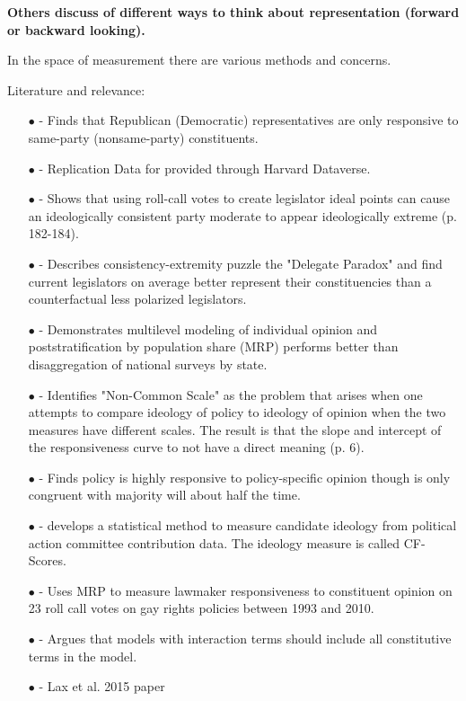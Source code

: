 \documentclass[10pt,letterpaper]{article}
\begin{document}
 \textbf{Others discuss of different ways to think about representation (forward or backward looking).} 
 
In the space of measurement there are various methods and concerns. 

Literature and relevance:
\begin{enumerate}
\item[$\bullet$] \cite{Clinton2006} - Finds that Republican (Democratic) representatives are only responsive to same-party (nonsame-party) constituents.
\item[$\bullet$] \cite{Clinton2009} - Replication Data for \cite{Clinton2006} provided through Harvard Dataverse.
\item[$\bullet$] \cite{Broockman2016} -  Shows that using roll-call votes to create legislator ideal points can cause an ideologically consistent party moderate to appear ideologically extreme (p. 182-184).
\item[$\bullet$] \cite{Ahler2018} - Describes consistency-extremity puzzle the "Delegate Paradox" and find current legislators on average better represent their constituencies than a counterfactual less polarized legislators.
\item[$\bullet$] \cite{Lax2009} - Demonstrates multilevel modeling of individual opinion and poststratification by population share (MRP) performs better than disaggregation of national surveys by state. 
\item[$\bullet$] \cite{Lax2018} - Identifies "Non-Common Scale" as the problem that arises when one attempts to compare ideology of policy to ideology of opinion when the two measures have different scales. The result is that the slope and intercept of the responsiveness curve to not have a direct meaning (p. 6).
\item[$\bullet$] \cite{Lax2012} - Finds policy is highly responsive to policy-specific opinion though is only congruent with majority will about half the time.
\item[$\bullet$] \cite{Bonica2013} - develops a statistical method to measure candidate ideology from political action committee contribution data. The ideology measure is called CF-Scores.
\item[$\bullet$] \cite{Krimmel2016} - Uses MRP to measure lawmaker responsiveness to constituent opinion on 23 roll call votes on gay rights policies between 1993 and 2010.
\item[$\bullet$] \cite{Brambor2006} - Argues that models with interaction terms should include all constitutive terms in the model.
\item[$\bullet$] - Lax et al. 2015 paper
\end{enumerate}
\end{document}
